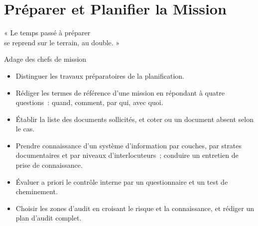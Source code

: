 
\chapter{Préparer et Planifier la Mission}
\label{chap:planifier}

\epigraph{%
    « Le temps passé à préparer\\
    se reprend sur le terrain, au double. »%
}{Adage des chefs de mission}


\begin{boxobjectifs}
\begin{itemize}
    \item Distinguer les travaux préparatoires de la planification.
    \item Rédiger les termes de référence d'une mission en répondant à quatre
          questions~: quand, comment, par qui, avec quoi.
    \item Établir la liste des documents sollicités, et coter \NEK{} ou
          \NON{} un document absent selon le cas.
    \item Prendre connaissance d'un système d'information par couches, par
          strates documentaires et par niveaux d'interlocuteurs~; conduire
          un entretien de prise de connaissance.
    \item Évaluer a priori le contrôle interne par un questionnaire et un
          test de cheminement.
    \item Choisir les zones d'audit en croisant le risque et la
          connaissance, et rédiger un plan d'audit complet.
\end{itemize}
\end{boxobjectifs}

